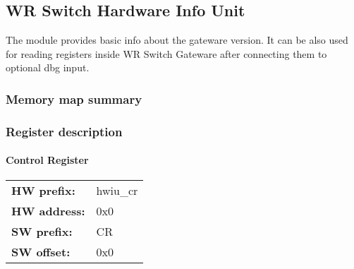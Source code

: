 \subsection{WR Switch Hardware Info Unit}
\label{subsec:wbgen:hwiu}
The module provides basic info about the gateware version. It can be also used for reading registers inside WR Switch Gateware after connecting them to optional dbg input.
\subsubsection{Memory map summary}

\subsubsection{Register description}
\paragraph*{Control Register}\vspace{12pt}

\begin{tabular}{l l }
{\bf HW prefix:}  & hwiu\_cr\\
{\bf HW address:}  & 0x0\\
{\bf SW prefix:}  & CR\\
{\bf SW offset:}  & 0x0\\
\end{tabular}


